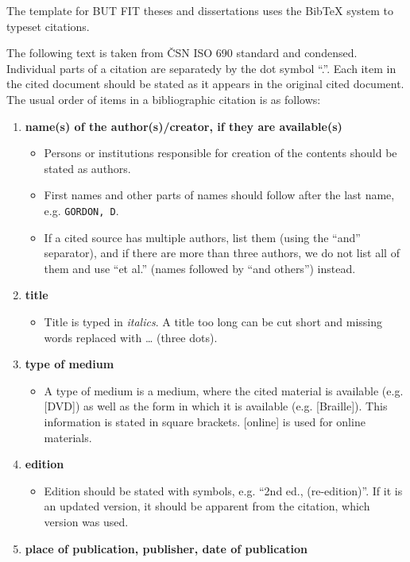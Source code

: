 The template for BUT FIT theses and dissertations uses the BibTeX system to typeset citations.

The following text is taken from ČSN ISO 690 standard and condensed. Individual parts of a citation are separatedy by the dot symbol ``.''.
Each item in the cited document should be stated as it appears in the original cited document. The usual order of items in a bibliographic citation is as follows:

\begin{enumerate}
    \item \textbf{name(s) of the author(s)/creator, if they are available(s)}
    \begin{itemize}
        \item Persons or institutions responsible for creation of the contents should be stated as authors.
        \item First names and other parts of names should follow after the last name, e.g. \texttt{GORDON, D}.
        \item If a cited source has multiple authors, list them (using the ``and'' separator), and if there are more than three authors, we do not list all of them and use ``et al.'' (names followed by ``and others'') instead.
    \end{itemize}
    \item \textbf{title}
    \begin{itemize}
        \item Title is typed in \textit{italics}. A title too long can be cut short and missing words replaced with \ldots{} (three dots).
    \end{itemize}
    \item \textbf{type of medium}
    \begin{itemize}
        \item A type of medium is a medium, where the cited material is available (e.g. [DVD]) as well as the form in which it is available (e.g. [Braille]). This information is stated in square brackets. [online] is used for online materials.
    \end{itemize}
    \item \textbf{edition}
    \begin{itemize}
        \item Edition should be stated with symbols, e.g. ``2nd ed., (re-edition)''. If it is an updated version, it should be apparent from the citation, which version was used.
    \end{itemize}
    \item \textbf{place of publication, publisher, date of publication}

\end{enumerate}
